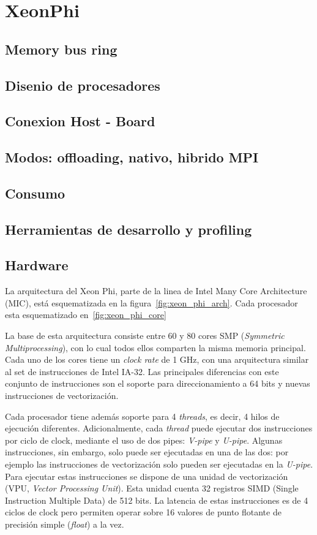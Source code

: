 
\section{XeonPhi}
   \subsection{Memory bus ring}
   \subsection{Disenio de procesadores}
   \subsection{Conexion Host - Board}
   \subsection{Modos: offloading, nativo, hibrido MPI}
   \subsection{Consumo}
   \subsection{Herramientas de desarrollo y profiling}

\subsection{Hardware}

La arquitectura del Xeon Phi, parte de la linea de Intel Many Core Architecture (MIC), est\'a esquematizada
en la figura~\ref{fig:xeon_phi_arch}. Cada procesador esta esquematizado en~\ref{fig:xeon_phi_core}

La base de esta arquitectura consiste entre 60 y 80 cores SMP (\textit{Symmetric Multiprocessing}), con lo cual todos
ellos comparten la misma memoria principal. Cada uno de los cores tiene un \textit{clock rate} de 1 GHz,
con una arquitectura similar al set de instrucciones de Intel IA-32. Las principales diferencias con este
conjunto de instrucciones son el soporte para direccionamiento a 64 bits y nuevas instrucciones de vectorizaci\'on.

Cada procesador tiene adem\'as soporte para 4 \textit{threads}, es decir, 4 hilos de ejecuci\'on diferentes. Adicionalmente,
cada \textit{thread} puede ejecutar dos instrucciones por ciclo de clock, mediante el uso de dos pipes: \textit{V-pipe} y \textit{U-pipe}.
Algunas instrucciones, sin embargo, solo puede ser ejecutadas en una de las dos: por ejemplo las instrucciones de vectorizaci\'on solo pueden
ser ejecutadas en la \textit{U-pipe}. Para ejecutar estas instrucciones se dispone de una unidad de vectorizaci\'on (VPU, \textit{Vector Processing Unit}).
Esta unidad cuenta 32 registros SIMD (Single Instruction Multiple Data) de 512 bits. La latencia de estas instrucciones es de 4 ciclos de clock pero permiten
operar sobre 16 valores de punto flotante de precisi\'on simple (\textit{float}) a la vez.

